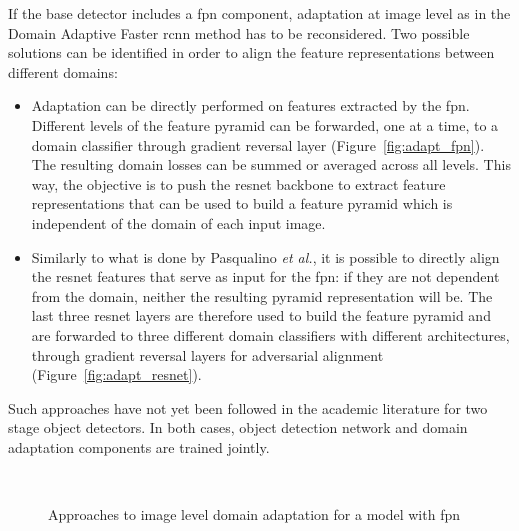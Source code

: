 \documentclass[%
    corpo=12pt,
    twoside,
    stile=classica,   
    tipotesi=magistrale,
    evenboxes,
    english,
	numerazioneromana,
]{toptesi}
\begin{document}
\bigskip
If the base detector includes a \gls{fpn} component, adaptation at image level as in the Domain Adaptive Faster \gls{rcnn} method has to be reconsidered. Two possible solutions can be identified in order to align the feature representations between different domains:
\begin{itemize}
	\item Adaptation can be directly performed on features extracted by the \gls{fpn}. Different levels of the feature pyramid can be forwarded, one at a time, to a domain classifier through gradient reversal layer (Figure~\ref{fig:adapt_fpn}). The resulting domain losses can be summed or averaged across all levels. This way, the objective is to push the \gls{resnet} backbone to extract feature representations that can be used to build a feature pyramid which is independent of the domain of each input image.
	\item Similarly to what is done by Pasqualino \textit{et al.}\cite{pasqualino2020unsupervised}, it is possible to directly align the \gls{resnet} features that serve as input for the \gls{fpn}: if they are not dependent from the domain, neither the resulting pyramid representation will be. The last three \gls{resnet} layers are therefore used to build the feature pyramid and are forwarded to three different domain classifiers with different architectures, through gradient reversal layers for adversarial alignment (Figure~\ref{fig:adapt_resnet}).
\end{itemize}
Such approaches have not yet been followed in the academic literature for two stage object detectors. In both cases, object detection network and domain adaptation components are trained jointly.

\begin{figure}[ht]
	\centering
	\\
	\caption{Approaches to image level domain adaptation for a model with \gls{fpn}}
\end{figure}
\end{document}
